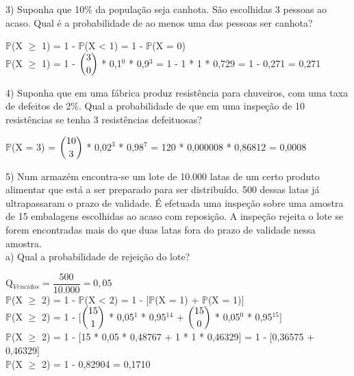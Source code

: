 \documentclass[12pt,a4paper]{article}
\begin{document}
	\vspace{1cm}
	3) Suponha que 10\% da população seja canhota. São escolhidas 3 pessoas ao acaso. Qual é a probabilidade de ao menos uma das pessoas ser canhota?
	\begin{center}
		\vspace{0.5cm}
		$\mathbb{P}$(X $\geq$ 1) = 1 - $\mathbb{P}$(X < 1) = 1 - $\mathbb{P}$(X = 0)
		\vspace{0.25cm}\\
		$\mathbb{P}$(X $\geq$ 1) = 1 - $\dbinom{3}{0}$ * 0,1$^0$ * 0,9$^3$ = 1 - 1 * 1 * 0,729 = 1 - 0,271 = 0,271 
	\end{center}
	\vspace{1cm}
	4) Suponha que em uma fábrica produz resistência para chuveiros, com uma taxa de	defeitos de 2\%. Qual a probabilidade de que em uma inspeção de 10 resistências se tenha 3 resistências defeituosas?
	\begin{center}
		\vspace{0.5cm}
		$\mathbb{P}$(X = 3) = $\dbinom{10}{3}$ * 0,02$^3$ * 0,98$^7$ = 120 * 0,000008 * 0,86812 = 0,0008
	\end{center}
	\vspace{1cm}
	5) Num armazém encontra-se um lote de 10.000 latas de um certo produto alimentar que está a ser preparado para ser distribuído. 500 dessas latas já ultrapassaram o prazo de validade. É efetuada uma inspeção sobre uma amostra de 15 embalagens escolhidas ao acaso com reposição. A inspeção rejeita o lote se forem encontradas mais do que duas
	latas fora do prazo de validade nessa amostra.\\ 
	a) Qual a probabilidade de rejeição do lote?
	\begin{center}
		\vspace{0.5cm}
		Q$_{Vencidos} = \dfrac{500}{10.000} = 0,05$
		\vspace{0.75cm}\\
		$\mathbb{P}$(X $\geq$ 2) = 1 - $\mathbb{P}$(X < 2) = 1 - [$\mathbb{P}$(X = 1) + $\mathbb{P}$(X = 1)]
		\vspace{0.25cm}\\
		$\mathbb{P}$(X $\geq$ 2) = 1 - [$\dbinom{15}{1}$ * 0,05$^1$ * 0,95$^14$ + $\dbinom{15}{0}$ * 0,05$^0$ * 0,95$^15$]
		\vspace{0.25cm}\\
		$\mathbb{P}$(X $\geq$ 2) = 1 - [15 * 0,05 * 0,48767 + 1 * 1 * 0,46329] = 1 - [0,36575 + 0,46329]
		\vspace{0.25cm}\\
		$\mathbb{P}$(X $\geq$ 2) = 1 - 0,82904 = 0,1710
	\end{center}
\end{document}
